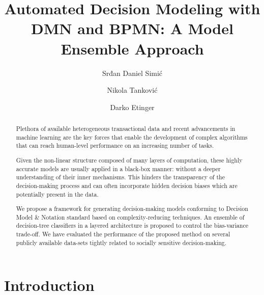 \documentclass[runningheads]{llncs}
\begin{document}
%
\title{Automated Decision Modeling with DMN and BPMN: A Model Ensemble Approach}
%
%
\author{Srđan Daniel Simić%
\and
Nikola Tanković%
\and
Darko Etinger%
}

%
%
\maketitle              %
%
\begin{abstract}

Plethora of available heterogeneous transactional data and recent advancements in machine learning are the key forces that enable the development of complex algorithms that can reach human-level performance on an increasing number of tasks.

Given the non-linear structure composed of many layers of computation, these highly accurate models are usually applied in a black-box manner: without a deeper understanding of their inner mechanisms. This hinders the transparency of the decision-making process and can often incorporate hidden decision biases which are potentially present in the data.

We propose a framework for generating decision-making models conforming to Decision Model \& Notation standard based on complexity-reducing techniques. An ensemble of decision-tree classifiers in a layered architecture is proposed to control the bias-variance trade-off. We have evaluated the performance of the proposed method on several publicly available data-sets tightly related to socially sensitive decision-making.

\end{abstract}


\section{Introduction}
\end{document}
